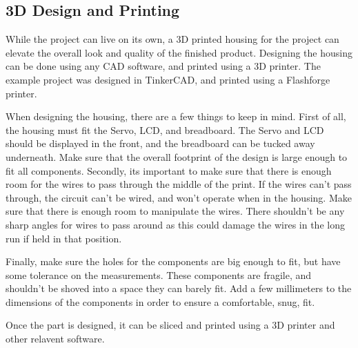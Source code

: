 \documentclass[titlepage]{article}
\begin{document}
\subsection*{3D Design and Printing}
While the project can live on its own, a 3D printed housing for the project can elevate the overall look and quality of the finished product. Designing the housing can be done using any CAD software, and printed using a 3D printer. The example project was designed in TinkerCAD, and printed using a Flashforge printer. \par
When designing the housing, there are a few things to keep in mind. First of all, the housing must fit the Servo, LCD, and breadboard. The Servo and LCD should be displayed in the front, and the breadboard can be tucked away underneath. Make sure that the overall footprint of the design is large enough to fit all components. Secondly, its important to make sure that there is enough room for the wires to pass through the middle of the print. If the wires can't pass through, the circuit can't be wired, and won't operate when in the housing. Make sure that there is enough room to manipulate the wires. There shouldn't be any sharp angles for wires to pass around as this could damage the wires in the long run if held in that position. \par
Finally, make sure the holes for the components are big enough to fit, but have some tolerance on the measurements. These components are fragile, and shouldn't be shoved into a space they can barely fit. Add a few millimeters to the dimensions of the components in order to ensure a comfortable, snug, fit. \par
Once the part is designed, it can be sliced and printed using a 3D printer and other relavent software. 
\end{document}
